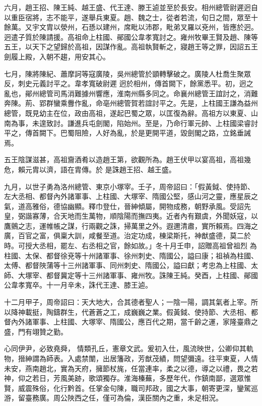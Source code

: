 \begin{pinyinscope}
 六月，趙王招、陳王純、越王盛、代王達、滕王逌並至於長安。相州總管尉遲迥自以重臣宿將，志不能平，遂舉兵東夏。趙、魏之士，從者若流，旬日之間，眾至十餘萬。又宇文胄以滎州，石愻以建州，席毗以沛郡，毗弟叉羅以兗州，皆應於迥。迥遣子質於陳請援。高祖命上柱國、鄖國公韋孝寬討之。雍州牧畢王賢及趙、陳等五王，以天下之望歸於高祖，因謀作亂。高祖執賢斬之，寢趙王等之罪，因詔五王劍履上殿，入朝不趨，用安其心。



 七月，陳將陳紀、蕭摩訶等寇廣陵，吳州總管於顗轉擊破之。廣陵人杜喬生聚眾反，刺史元義討平之。韋孝寬破尉遲
 迥於相州，傳首闕下，餘黨悉平。初，迥之亂也，鄖州總管司馬消難據州響應，淮南州縣多同之。命襄州總管王誼討之，消難奔陳。荊、郢群蠻乘釁作亂，命亳州總管賀若誼討平之。先是，上柱國王謙為益州總管，既見幼主在位，政由高祖，遂起巴蜀之眾，以匡復為辭。高祖方以東夏、山南為事，未遑致討。謙進兵屯劍閣，陷始州。至是，乃命行軍元帥、上柱國梁睿討平之，傳首闕下。巴蜀阻險，人好為亂，於是更開平道，毀劍閣之路，立銘垂誡焉。



 五王陰謀滋甚，高祖齎酒肴以造趙王第，欲觀所為。趙王伏甲以宴高祖，高祖幾危，賴元胄以濟，語在胄傳。於
 是誅趙王招、越王盛。



 九月，以世子勇為洛州總管、東京小塚宰。壬子，周帝詔曰：「假黃鉞、使持節、左大丞相、都督內外諸軍事、上柱國、大塚宰、隋國公堅，感山河之靈，應星辰之氣，道高雅俗，德協幽顯。釋巾登仕，晉紳傾屬，開物成務，朝野承風。受詔先皇，弼諧寡薄，合天地而生萬物，順陰陽而撫四夷。近者內有艱虞，外聞妖寇，以鷹鸇之志，運帷帳之謀，行兩觀之誅，掃萬里之外。遐邇清肅，實所賴焉。四海之廣，百官之富，俱稟大訓，咸餐至道。治定功成，棟梁斯托，神猷盛德，莫二於時。可授大丞相，罷左、右丞相之官，餘如故。」冬十月壬申，詔贈高祖曾祖烈
 為柱國、太保、都督徐兗等十州諸軍事、徐州刺史、隋國公，謚曰康；祖禎為柱國、太傅、都督陜蒲等十三州諸軍事、同州刺史、隋國公，謚曰獻；考忠為上柱國、太師、大塚宰、都督冀定等十三州諸軍事、雍州牧。誅陳王純。癸酉，上柱國、鄖國公韋孝寬卒。十一月辛未，誅代王達、膝王逌。



 十二月甲子，周帝詔曰：天大地大，合其德者聖人；一陰一陽，調其氣者上宰。所以降神載挺，陶鑄群生，代蒼蒼之工，成巍巍之業。假黃鉞、使持節、大丞相、都督內外諸軍事、上柱國、大塚宰、隋國公，應百代之期，當千齡之運，家隆臺鼎之盛，門有翊贊之勤。



 心同伊尹，必致堯舜，
 情類孔丘，憲章文武。爰初入仕，風流映世，公卿仰其軌物，搢紳謂為師表。入處禁闈，出居籓政，芳猷茂績，問望彌遠。往平東夏，人情未安，燕南趙北，實為天府，擁節杖旄，任當連率，柔之以德，導之以禮，畏之若神，仰之若日，芳風美跡，歌頌獨存。淮海榛蕪，多歷年代，作鎮南鄙，選眾惟賢，威震殊俗，化行黔首。任掌金句陳，職司邦政，國之大事，朝寄更深，鑾駕巡游，留臺務廣。周公陜西之任，僅可為倫，漢臣關內之重，未足相況。




\end{pinyinscope}
